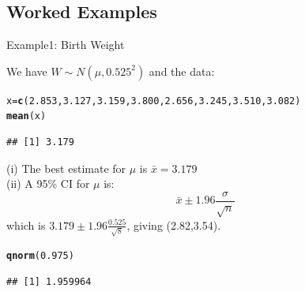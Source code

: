 \documentclass[t,xcolor=pdftex,dvipsnames,table]{beamer}
\makeatletter
\newcommand{\hlnum}[1]{\textcolor[rgb]{0.686,0.059,0.569}{#1}}%
\newcommand{\hlstd}[1]{\textcolor[rgb]{0.345,0.345,0.345}{#1}}%
\newcommand{\hlkwb}[1]{\textcolor[rgb]{0.69,0.353,0.396}{#1}}%
\newcommand{\hlkwd}[1]{\textcolor[rgb]{0.737,0.353,0.396}{\textbf{#1}}}%
\newenvironment{kframe}{%
 \def\at@end@of@kframe{}%
 \ifinner\ifhmode%
  \def\at@end@of@kframe{\end{minipage}}%
  \begin{minipage}{\columnwidth}%
 \fi\fi%
 \def\FrameCommand##1{\hskip\@totalleftmargin \hskip-\fboxsep
 \colorbox{shadecolor}{##1}\hskip-\fboxsep
     \hskip-\linewidth \hskip-\@totalleftmargin \hskip\columnwidth}%
 \MakeFramed {\advance\hsize-\width
   \@totalleftmargin\z@ \linewidth\hsize
   \@setminipage}}%
 {\par\unskip\endMakeFramed%
 \at@end@of@kframe}
\newenvironment{knitrout}{}{} %
\makeatother
\begin{document}
\subsection[Worked Examples]{Worked Examples}
\begin{frame}[fragile]{Example1: Birth Weight}

We have $W \sim N(\mu,0.525^2)$ and the data:

\begin{knitrout}
\color{fgcolor}\begin{kframe}
\begin{alltt}
\hlstd{x}\hlkwb{=}\hlkwd{c}\hlstd{(}\hlnum{2.853}\hlstd{,}\hlnum{3.127}\hlstd{,}\hlnum{3.159}\hlstd{,}\hlnum{3.800}\hlstd{,}\hlnum{2.656}\hlstd{,}\hlnum{3.245}\hlstd{,}\hlnum{3.510}\hlstd{,}\hlnum{3.082}\hlstd{)}
\hlkwd{mean}\hlstd{(x)}
\end{alltt}
\begin{verbatim}
## [1] 3.179
\end{verbatim}
\end{kframe}
\end{knitrout}

(i) The best estimate for $\mu$ is $\bar{x} = 3.179$ \\

\vspace{.5cm}
(ii) A 95\% CI for $\mu$ is: 
\[ \bar{x}  \pm 1.96 \frac{\sigma}{\sqrt{n}} \] which is $3.179  \pm 1.96 \frac{0.525}{\sqrt{8}}$, giving (2.82,3.54).
\begin{knitrout}
\color{fgcolor}\begin{kframe}
\begin{alltt}
\hlkwd{qnorm}\hlstd{(}\hlnum{0.975}\hlstd{)}
\end{alltt}
\begin{verbatim}
## [1] 1.959964
\end{verbatim}
\end{kframe}
\end{knitrout}
\end{frame}
\end{document}
